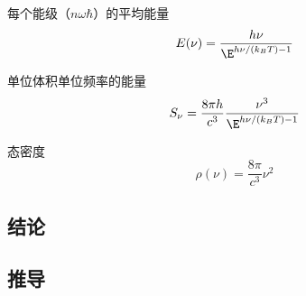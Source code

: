 

每个能级（$n\omega\hbar$）的平均能量
\begin{equation}
E(\nu) = \frac{h\nu}{\E^{h\nu/(k_B T) - 1}}
\end{equation}

单位体积单位频率的能量
\begin{equation}
S_\nu = \frac{8\pi h}{c^3}\frac{\nu^3}{\E^{h\nu/(k_B T) - 1}}
\end{equation}

态密度
\begin{equation}
\rho(\nu) = \frac{8\pi}{c^3}\nu^2
\end{equation}

\subsection{结论}

\subsection{推导}
